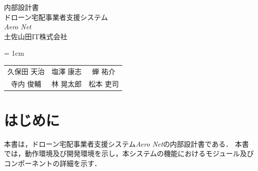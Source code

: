 \documentclass[a4paper, titlepage]{jsarticle}
\date{\today}
\newcommand{\system}{\textsl{Aero Net}}
\begin{document}
\begin{titlepage}
  \centering
  \vspace*{150truept}
  {\Large 内部設計書}\\
  \vspace*{50truept}
  {\Huge ドローン宅配事業者支援システム} \\
  \vspace{15truept}
  {\Huge \system} \\
  \vspace{50truept}
  {\LARGE 土佐山田IT株式会社}\\
  \vspace{20truept}
  {\large{\tabcolsep = 1cm
      \begin{tabular}{ccc}
        久保田 天治 & 塩澤 康志 & 蝉 祐介  \\
        寺内 俊輔  & 林 晃太郎 & 松本 吏司
      \end{tabular}
    }}
\end{titlepage}

\newcommand{\fig}[4]{
  \begin{figure}[H]
    \centering
    \texttt{[image: \#1/\#2]}
    \caption{#3}
    \label{fig:#1_#2}
  \end{figure}
}

\newcommand{\definition}[2]{
  \begin{figure}[H]
    \centering
    \texttt{[image: module/definition/\#1.pdf]}
    \caption{#2}
    \label{fig:#1}
  \end{figure}
  \clearpage
}
\newcommand{\moduleTransition}[2]{
  \begin{figure}[H]
    \centering
    \texttt{[image: module/transition/\#1.pdf]}
    \caption{#2}
    \label{fig:#1}
  \end{figure}
  \clearpage
}

\newcommand{\componentTransition}[2]{
  \begin{figure}[H]
    \centering
    \texttt{[image: component/transition/\#1.pdf]}
    \caption{#2}
    \label{fig:#1}
  \end{figure}
  \clearpage
}
\tableofcontents

\clearpage

\section{はじめに}
本書は，ドローン宅配事業者支援システム\system の内部設計書である．
本書では，動作環境及び開発環境を示し，本システムの機能におけるモジュール及びコンポーネントの詳細を示す．
\end{document}
